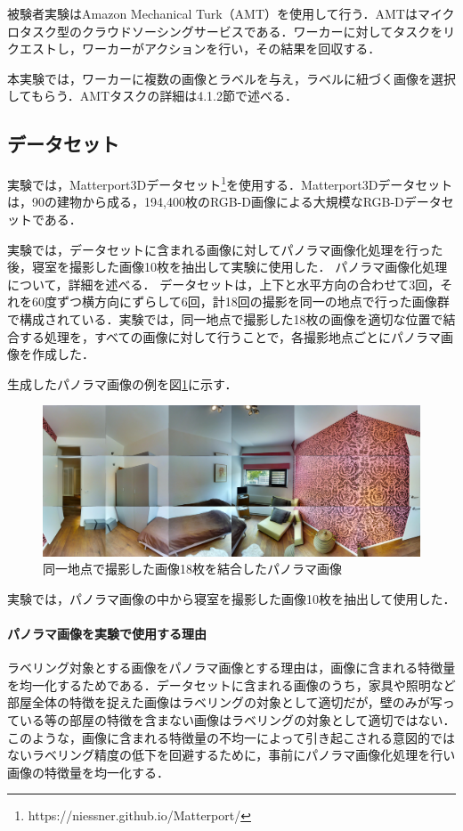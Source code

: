 \documentclass[a4paper,11pt]{jreport}
\begin{document}
被験者実験はAmazon Mechanical Turk（AMT）を使用して行う．AMTはマイクロタスク型のクラウドソーシングサービスである．ワーカーに対してタスクをリクエストし，ワーカーがアクションを行い，その結果を回収する．

本実験では，ワーカーに複数の画像とラベルを与え，ラベルに紐づく画像を選択してもらう．AMTタスクの詳細は4.1.2節で述べる．

\subsection{データセット}

実験では，Matterport3Dデータセット\footnote{https://niessner.github.io/Matterport/}を使用する．Matterport3Dデータセットは，90の建物から成る，194,400枚のRGB-D画像による大規模なRGB-Dデータセットである．

実験では，データセットに含まれる画像に対してパノラマ画像化処理を行った後，寝室を撮影した画像10枚を抽出して実験に使用した．
パノラマ画像化処理について，詳細を述べる．
データセットは，上下と水平方向の合わせて3回，それを60度ずつ横方向にずらして6回，計18回の撮影を同一の地点で行った画像群で構成されている．実験では，同一地点で撮影した18枚の画像を適切な位置で結合する処理を，すべての画像に対して行うことで，各撮影地点ごとにパノラマ画像を作成した．

生成したパノラマ画像の例を図\ref{fig:panorama_example}に示す．

\begin{figure}[H]
  \centering
  \includegraphics[width=\linewidth]{figures/panorama.jpeg}
  \caption{同一地点で撮影した画像18枚を結合したパノラマ画像}
  \label{fig:panorama_example}
\end{figure}

実験では，パノラマ画像の中から寝室を撮影した画像10枚を抽出して使用した．

\paragraph{パノラマ画像を実験で使用する理由}
ラベリング対象とする画像をパノラマ画像とする理由は，画像に含まれる特徴量を均一化するためである．データセットに含まれる画像のうち，家具や照明など部屋全体の特徴を捉えた画像はラベリングの対象として適切だが，壁のみが写っている等の部屋の特徴を含まない画像はラベリングの対象として適切ではない．このような，画像に含まれる特徴量の不均一によって引き起こされる意図的ではないラベリング精度の低下を回避するために，事前にパノラマ画像化処理を行い画像の特徴量を均一化する．
\end{document}
